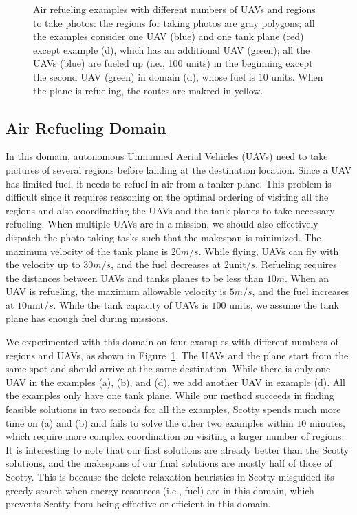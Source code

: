 \documentclass[sigconf]{acmart}
\begin{document}
\begin{figure}[]
    \caption{\small \small Air refueling examples with different numbers of UAVs and regions to take photos:  the regions for taking photos are gray polygons; all the examples consider one UAV (blue) and one tank plane (red) except example (d), which has an additional UAV (green); all the UAVs (blue) are fueled up (i.e., 100 units) in the beginning except the second UAV (green) in domain (d), whose fuel is 10 units. When the plane is refueling, the routes are makred in yellow.}
    \label{fig:air_execution}
\end{figure}




\subsection{Air Refueling Domain} \label{section:results:air}
In this domain, autonomous Unmanned Aerial Vehicles (UAVs) need to take pictures of several regions before landing at the destination location. Since a UAV has limited fuel, it needs to refuel in-air from a tanker plane. This problem is difficult since it requires reasoning on the optimal ordering of visiting all the regions and also coordinating the UAVs and the tank planes to take necessary refueling. When multiple UAVs are in a mission, we should also effectively dispatch the photo-taking tasks such that the makespan is minimized. The maximum velocity of the tank plane is $20m/s$. While flying, UAVs can fly with the velocity up to $30m/s$, and the fuel decreases at $2\text{unit}/s$. Refueling requires the distances between UAVs and tanks planes to be less than $10m$. When an UAV is refueling, the maximum allowable velocity is $5m/s$, and the fuel increases at $10\text{unit}/s$. While the tank capacity of UAVs is $100$ units, we assume the tank plane has enough fuel during missions.

We experimented with this domain on four examples with different numbers of regions and UAVs, as shown in Figure~\ref{fig:air_execution}. The UAVs and the plane start from the same spot and should arrive at the same destination. While there is only one UAV in the examples (a), (b), and (d), we add another UAV in example (d). All the examples only have one tank plane. While our method succeeds in finding feasible solutions in two seconds for all the examples, Scotty spends much more time on (a) and (b) and fails to solve the other two examples within $10$ minutes, which require more complex coordination on visiting a larger number of regions. It is interesting to note that our first solutions are already better than the Scotty solutions, and the makespans of our final solutions are mostly half of those of Scotty. This is because the delete-relaxation heuristics in Scotty misguided its greedy search when energy resources (i.e., fuel) are in this domain, which prevents Scotty from being effective or efficient in this domain.
\end{document}
